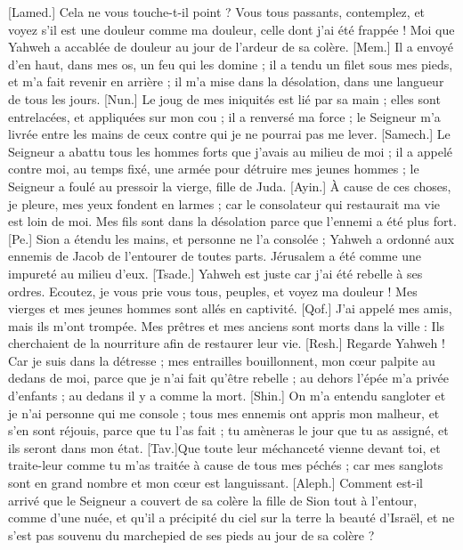 \begin{multicols}{2}
[Lamed.] Cela ne vous touche-t-il point ? Vous tous passants, contemplez, et voyez s'il est une douleur comme ma douleur, celle dont j'ai été frappée ! Moi que Yahweh a accablée de douleur au jour de l'ardeur de sa colère.
[Mem.] Il a envoyé d'en haut, dans mes os, un feu qui les domine ; il a tendu un filet sous mes pieds, et m'a fait revenir en arrière ; il m'a mise dans la désolation, dans une langueur de tous les jours.
[Nun.] Le joug de mes iniquités est lié par sa main ; elles sont entrelacées, et appliquées sur mon cou ; il a renversé ma force ; le Seigneur m'a livrée entre les mains de ceux contre qui je ne pourrai pas me lever.
[Samech.] Le Seigneur a abattu tous les hommes forts que j'avais au milieu de moi ; il a appelé contre moi, au temps fixé, une armée pour détruire mes jeunes hommes ; le Seigneur a foulé au pressoir la vierge, fille de Juda.
[Ayin.] À cause de ces choses, je pleure, mes yeux fondent en larmes ; car le consolateur qui restaurait ma vie est loin de moi. Mes fils sont dans la désolation parce que l'ennemi a été plus fort.
[Pe.] Sion a étendu les mains, et personne ne l'a consolée ; Yahweh a ordonné aux ennemis de Jacob de l'entourer de toutes parts. Jérusalem a été comme une impureté au milieu d'eux.
[Tsade.] Yahweh est juste car j'ai été rebelle à ses ordres. Ecoutez, je vous prie vous tous, peuples, et voyez ma douleur ! Mes vierges et mes jeunes hommes sont allés en captivité.
[Qof.] J'ai appelé mes amis, mais ils m'ont trompée. Mes prêtres et mes anciens sont morts dans la ville : Ils cherchaient de la nourriture afin de restaurer leur vie.
[Resh.] Regarde Yahweh ! Car je suis dans la détresse ; mes entrailles bouillonnent, mon cœur palpite au dedans de moi, parce que je n'ai fait qu'être rebelle ; au dehors l'épée m'a privée d'enfants ; au dedans il y a comme la mort. 
[Shin.] On m'a entendu sangloter et je n'ai personne qui me console ; tous mes ennemis ont appris mon malheur, et s'en sont réjouis, parce que tu l'as fait ; tu amèneras le jour que tu as assigné, et ils seront dans mon état.
[Tav.]Que toute leur méchanceté vienne devant toi, et traite-leur comme tu m'as traitée à cause de tous mes péchés ; car mes sanglots sont en grand nombre et mon cœur est languissant. 
\VerseOne{}[Aleph.] Comment est-il arrivé que le Seigneur a couvert de sa colère la fille de Sion tout à l'entour, comme d'une nuée, et qu'il a précipité du ciel sur la terre la beauté d'Israël, et ne s'est pas souvenu du marchepied de ses pieds au jour de sa colère ?

\end{multicols}
